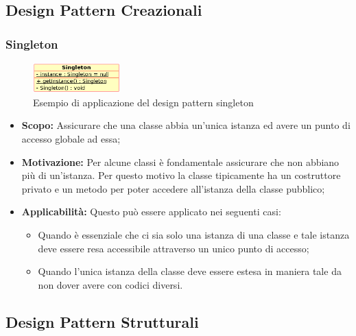 \documentclass{scalatekids-article}
\begin{document}
\subsection{Design Pattern Creazionali}

\subsubsection{Singleton}

\begin{figure}[H]
  \begin{center}
    \includegraphics[width=0.3\textwidth, keepaspectratio]{img/designPattern/Singleton.png}
    \caption{Esempio di applicazione del design pattern singleton}
  \end{center}
\end{figure}

\begin{itemize}

\item \textbf{Scopo:} Assicurare che una classe abbia un'unica istanza ed avere
un punto di accesso globale ad essa;

\item \textbf{Motivazione:} Per alcune classi è fondamentale assicurare che non
abbiano più di un'istanza. Per questo motivo la classe tipicamente ha un
costruttore privato e un metodo per poter accedere all'istanza della classe
pubblico;

\item \textbf{Applicabilità:} Questo  può essere
applicato nei seguenti casi:
   \begin{itemize}
   \item Quando è essenziale che ci sia solo una istanza di una classe e tale
   istanza deve essere resa accessibile attraverso un unico punto di accesso;
   \item Quando l'unica istanza della classe deve essere estesa in maniera
   tale da non dover avere  con codici diversi.
   \end{itemize}

\end{itemize}

\subsection{Design Pattern Strutturali}
\end{document}
